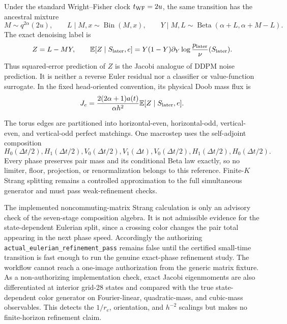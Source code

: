 \documentclass[11pt]{article}
\numberwithin{equation}{section}
\newcommand{\1}{\mathbf 1}
\begin{document}
Under the standard Wright--Fisher clock \(t_{\rm WF}=2u\), the same
transition has the ancestral mixture
\begin{equation}
  M\sim q^{2\alpha}(2u),\qquad
  L\mid M,x\sim\operatorname{Bin}(M,x),\qquad
  Y\mid M,L\sim\operatorname{Beta}(\alpha+L,\alpha+M-L).
\end{equation}
The exact denoising label is
\begin{equation}
  Z=L-MY,
  \qquad
  \mathbb E[Z\mid S_{\rm later},e]
  =Y(1-Y)\partial_Y\log\frac{p_{\rm later}}{\nu}(S_{\rm later}).
  \label{eq:d0-jacobi-denoising-label}
\end{equation}
Thus squared-error prediction of \(Z\) is the Jacobi analogue of DDPM noise
prediction.  It is neither a reverse Euler residual nor a classifier or
value-function surrogate.  In the fixed head-oriented convention, its
physical Doob mass flux is
\begin{equation}
  J_e=\frac{2(2\alpha+1)a(t)}{\alpha h^2}
  \mathbb E[Z\mid S_{\rm later},e].
\end{equation}

The torus edges are partitioned into horizontal-even, horizontal-odd,
vertical-even, and vertical-odd perfect matchings.  One macrostep uses the
self-adjoint composition
\[
  H_0(\Delta t/2),H_1(\Delta t/2),V_0(\Delta t/2),V_1(\Delta t),
  V_0(\Delta t/2),H_1(\Delta t/2),H_0(\Delta t/2).
\]
Every phase preserves pair mass and its conditional Beta law exactly, so no
limiter, floor, projection, or renormalization belongs to this reference.
Finite-\(K\) Strang splitting remains a controlled approximation to the full
simultaneous generator and must pass weak-refinement checks.

The implemented noncommuting-matrix Strang calculation is only an advisory
check of the seven-stage composition algebra.  It is not admissible evidence
for the state-dependent Eulerian split, since a crossing color changes the
pair total appearing in the next phase speed.  Accordingly the authorizing
\nolinkurl{actual_eulerian_refinement_pass} remains false until the certified
small-time transition is fast enough to run the genuine exact-phase
refinement study.  The workflow cannot reach a one-image authorization from
the generic matrix fixture.
As a non-authorizing implementation check, exact Jacobi eigenmoments are also
differentiated at interior grid-28 states and compared with the true
state-dependent color generator on Fourier-linear, quadratic-mass, and
cubic-mass observables.  This detects the \(1/r_e\), orientation, and
\(h^{-2}\) scalings but makes no finite-horizon refinement claim.
\end{document}
